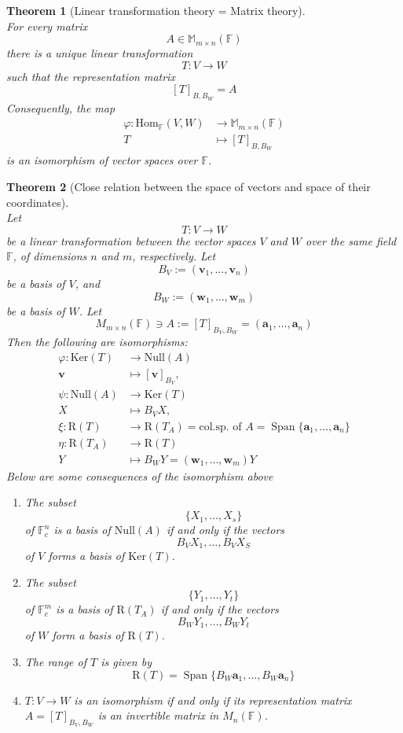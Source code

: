 \documentclass[12pt]{article}
\newcommand{\row}{\mathrm{R}}
\newcommand{\kerne}{\mathrm{Ker}}
\newcommand{\nul}{\mathrm{Null}}
\newcommand{\Hom}{\mathrm{Hom}}
\newtheorem{theorem}{Theorem}[section]
\theoremstyle{definition}
\DeclareMathOperator{\spn}{Span}
\begin{document}
\begin{theorem}[Linear transformation theory = Matrix theory]
\hfill\\\normalfont For every matrix
\[
A\in\mathbb{M}_{m\times n}(\mathbb{F})
\]
there is a unique linear transformation
\[
T:V\to W
\]
such that the representation matrix
\[
[T]_{B,B_W}=A
\]
Consequently, the map
\[
\begin{aligned}
\varphi:\Hom_\mathbb{F}(V,W)&\to\mathbb{M}_{m\times n}(\mathbb{F})\\
T&\mapsto [T]_{B,B_W}
\end{aligned}
\]
is an isomorphism of vector spaces over $\mathbb{F}$.
\end{theorem}
\begin{theorem}[Close relation between the space of vectors and space of their coordinates]
\hfill\\\normalfont Let 
\[
T:V\to W
\]
be a linear transformation between the vector spaces $V$ and $W$ over the same field $\mathbb{F}$, of dimensions $n$ and $m$, respectively. Let
\[
B_V:=(\mathbf{v}_1,\ldots,\mathbf{v}_n)
\]
be a basis of $V$, and
\[
B_W:=(\mathbf{w}_1,\ldots,\mathbf{w}_m)
\]
be a basis of $W$. Let
\[
M_{m\times n}(\mathbb{F})\ni A:=[T]_{B_V,B_W} = (\mathbf{a}_1,\ldots,\mathbf{a}_n)
\]
Then the following are isomorphisms:
\[
\begin{aligned}
\varphi: \kerne(T)&\to\nul(A)\\
\mathbf{v}&\mapsto[\mathbf{v}]_{B_V},\\
\psi:\nul(A)&\to\kerne(T)\\
X&\mapsto B_V X,\\
\xi:\row(T)&\to \row(T_A)=\text{col.sp. of }A = \spn\{\mathbf{a}_1,\ldots,\mathbf{a}_n\}\\
\eta:\row(T_A)&\to\row(T)\\
Y&\mapsto B_WY=(\mathbf{w}_1,\ldots,\mathbf{w}_m)Y
\end{aligned}
\]
Below are some consequences of the isomorphism above
\begin{enumerate}[label=(\arabic*)]
\item The subset
\[
\{X_1,\ldots,X_s\}
\]
of $\mathbb{F}^n_c$ is a basis of $\nul(A)$ if and only if the vectors
\[
B_VX_1,\ldots,B_VX_S
\]
of $V$ forms a basis of $\kerne(T)$.
\item The subset 
\[
\{Y_1,\ldots,Y_t\}
\]
of $\mathbb{F}^m_c$ is a basis of $\row(T_A)$ if and only if the vectors
\[
B_WY_1,\ldots,B_WY_t
\]
of $W$ form a basis of $\row(T)$.
\item The range of $T$ is given by
\[
\row(T)=\spn\{B_W\mathbf{a}_1,\ldots,B_W\mathbf{a}_n\}
\]
\item $T:V\to W$ is an isomorphism if and only if its representation matrix $A = [T]_{B_V,B_W}$ is an invertible matrix in $M_n(\mathbb{F})$.
\end{enumerate}
\end{theorem}
\end{document}

